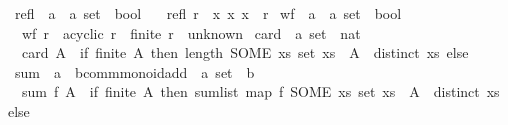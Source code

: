 \begin{isabellebody}
\isanewline
{}\isamarkupfalse%
\ refl{\isacharprime}{\kern0pt}\ {\isacharcolon}{\kern0pt}{\isacharcolon}{\kern0pt}\ {\isachardoublequoteopen}{\isacharparenleft}{\kern0pt}{\isacharprime}{\kern0pt}a\ {\isasymtimes}\ {\isacharprime}{\kern0pt}a{\isacharparenright}{\kern0pt}\ set\ {\isasymRightarrow}\ bool{\isachardoublequoteclose}\ \isanewline
\ \ {\isachardoublequoteopen}refl{\isacharprime}{\kern0pt}\ r\ {\isasymequiv}\ {\isasymforall}x{\isachardot}{\kern0pt}\ {\isacharparenleft}{\kern0pt}x{\isacharcomma}{\kern0pt}\ x{\isacharparenright}{\kern0pt}\ {\isasymin}\ r{\isachardoublequoteclose}\isanewline
\isanewline
{}\isamarkupfalse%
\ wf{\isacharprime}{\kern0pt}\ {\isacharcolon}{\kern0pt}{\isacharcolon}{\kern0pt}\ {\isachardoublequoteopen}{\isacharparenleft}{\kern0pt}{\isacharprime}{\kern0pt}a\ {\isasymtimes}\ {\isacharprime}{\kern0pt}a{\isacharparenright}{\kern0pt}\ set\ {\isasymRightarrow}\ bool{\isachardoublequoteclose}\ \isanewline
\ \ {\isachardoublequoteopen}wf{\isacharprime}{\kern0pt}\ r\ {\isasymequiv}\ acyclic\ r\ {\isasymand}\ {\isacharparenleft}{\kern0pt}finite\ r\ {\isasymor}\ unknown{\isacharparenright}{\kern0pt}{\isachardoublequoteclose}\isanewline
\isanewline
{}\isamarkupfalse%
\ card{\isacharprime}{\kern0pt}\ {\isacharcolon}{\kern0pt}{\isacharcolon}{\kern0pt}\ {\isachardoublequoteopen}{\isacharprime}{\kern0pt}a\ set\ {\isasymRightarrow}\ nat{\isachardoublequoteclose}\ \isanewline
\ \ {\isachardoublequoteopen}card{\isacharprime}{\kern0pt}\ A\ {\isasymequiv}\ if\ finite\ A\ then\ length\ {\isacharparenleft}{\kern0pt}SOME\ xs{\isachardot}{\kern0pt}\ set\ xs\ {\isacharequal}{\kern0pt}\ A\ {\isasymand}\ distinct\ xs{\isacharparenright}{\kern0pt}\ else\ {}{\isachardoublequoteclose}\isanewline
\isanewline
{}\isamarkupfalse%
\ sum{\isacharprime}{\kern0pt}\ {\isacharcolon}{\kern0pt}{\isacharcolon}{\kern0pt}\ {\isachardoublequoteopen}{\isacharparenleft}{\kern0pt}{\isacharprime}{\kern0pt}a\ {\isasymRightarrow}\ {\isacharprime}{\kern0pt}b{\isacharcolon}{\kern0pt}{\isacharcolon}{\kern0pt}comm{\isacharunderscore}{\kern0pt}monoid{\isacharunderscore}{\kern0pt}add{\isacharparenright}{\kern0pt}\ {\isasymRightarrow}\ {\isacharprime}{\kern0pt}a\ set\ {\isasymRightarrow}\ {\isacharprime}{\kern0pt}b{\isachardoublequoteclose}\ \isanewline
\ \ {\isachardoublequoteopen}sum{\isacharprime}{\kern0pt}\ f\ A\ {\isasymequiv}\ if\ finite\ A\ then\ sum{\isacharunderscore}{\kern0pt}list\ {\isacharparenleft}{\kern0pt}map\ f\ {\isacharparenleft}{\kern0pt}SOME\ xs{\isachardot}{\kern0pt}\ set\ xs\ {\isacharequal}{\kern0pt}\ A\ {\isasymand}\ distinct\ xs{\isacharparenright}{\kern0pt}{\isacharparenright}{\kern0pt}\ else\ {}{\isachardoublequoteclose}\isanewline

\end{isabellebody}
